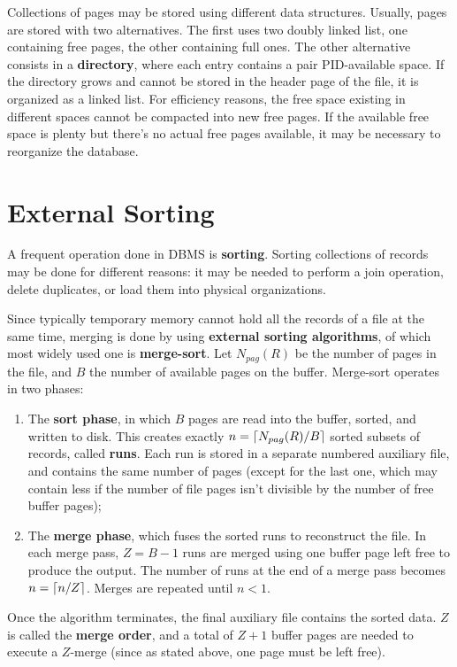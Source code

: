 Collections of pages may be stored using different data structures. Usually, pages are stored with two alternatives. The first uses two doubly linked list, one containing free pages, the other containing full ones. The other alternative consists in a \textbf{directory}, where each entry contains a pair PID-available space. If the directory grows and cannot be stored in the header page of the file, it is organized as a linked list. For efficiency reasons, the free space existing in different spaces cannot be compacted into new free pages. If the available free space is plenty but there's no actual free pages available, it may be necessary to reorganize the database.

\section{External Sorting}

A frequent operation done in DBMS is \textbf{sorting}. Sorting collections of records may be done for different reasons: it may be needed to perform a join operation, delete duplicates, or load them into physical organizations.

Since typically temporary memory cannot hold all the records of a file at the same time, merging is done by using \textbf{external sorting algorithms}, of which most widely used one is \textbf{merge-sort}. Let $N_{pag}(R)$ be the number of pages in the file, and $B$ the number of available pages on the buffer. Merge-sort operates in two phases:
\begin{enumerate}
    \item The \textbf{sort phase}, in which $B$ pages are read into the buffer, sorted, and written to disk. This creates exactly $n = \left\lceil N_{pag}(R) / B\right\rceil$ sorted subsets of records, called \textbf{runs}. Each run is stored in a separate numbered auxiliary file, and contains the same number of pages (except for the last one, which may contain less if the number of file pages isn't divisible by the number of free buffer pages);

    \item The \textbf{merge phase}, which fuses the sorted runs to reconstruct the file. In each merge pass, $Z = B-1$ runs are merged using one buffer page left free to produce the output. The number of runs at the end of a merge pass becomes $n = \left\lceil n/Z\right\rceil$. Merges are repeated until $n < 1$.
\end{enumerate}
Once the algorithm terminates, the final auxiliary file contains the sorted data. $Z$ is called the \textbf{merge order}, and a total of $Z + 1$ buffer pages are needed to execute a $Z$-merge (since as stated above, one page must be left free).

